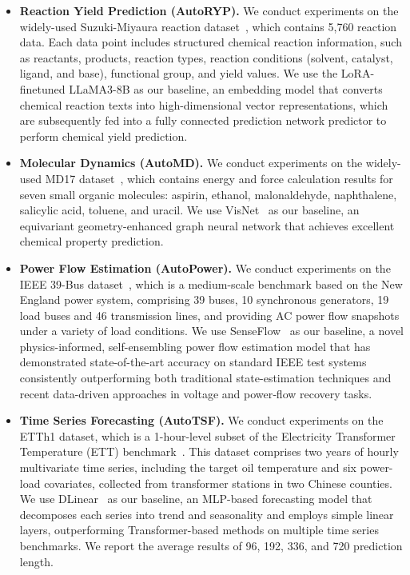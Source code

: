 \begin{itemize}
    \item \textbf{Reaction Yield Prediction (AutoRYP).} We conduct experiments on the widely-used Suzuki-Miyaura reaction dataset~\citep{perera2018platform}, which contains 5,760 reaction data. Each data point includes structured chemical reaction information, such as reactants, products, reaction types, reaction conditions (solvent, catalyst, ligand, and base), functional group, and yield values. We use the LoRA-finetuned LLaMA3-8B as our baseline, an embedding model that converts chemical reaction texts into high-dimensional vector representations, which are subsequently fed into a fully connected prediction network predictor to perform chemical yield prediction.
    \item  \textbf{Molecular Dynamics (AutoMD).} We conduct experiments on the widely-used MD17 dataset~\citep{chmiela2017machine}, which contains energy and force calculation results for seven small organic molecules: aspirin, ethanol, malonaldehyde, naphthalene, salicylic acid, toluene, and uracil. We use VisNet~\citep{wang2024enhancing} as our baseline, an equivariant geometry-enhanced graph neural network that achieves excellent chemical property prediction.
    \item  \textbf{Power Flow Estimation (AutoPower).} We conduct experiments on the IEEE 39-Bus dataset~\citep{zimmerman2010matpower}, which is a medium-scale benchmark based on the New England power system, comprising 39 buses, 10 synchronous generators, 19 load buses and 46 transmission lines, and providing AC power flow snapshots under a variety of load conditions. We use SenseFlow~\citep{zhao2024senseflow} as our baseline, a novel physics-informed, self-ensembling power flow estimation model that has demonstrated state-of-the-art accuracy on standard IEEE test systems  consistently outperforming both traditional state-estimation techniques and recent data-driven approaches in voltage and power‐flow recovery tasks.
    \item  \textbf{Time Series Forecasting (AutoTSF).} We conduct experiments on the ETTh1 dataset, which is a 1-hour-level subset of the Electricity Transformer Temperature (ETT) benchmark~\citep{haoyietal-informer-2021}. This dataset comprises two years of hourly multivariate time series, including the target oil temperature and six power-load covariates, collected from transformer stations in two Chinese counties. We use DLinear~\citep{zeng2023transformers} as our baseline, an MLP-based forecasting model that decomposes each series into trend and seasonality and employs simple linear layers, outperforming Transformer-based methods on multiple time series benchmarks.  We report the average results of 96, 192, 336, and 720 prediction length.

\end{itemize}
